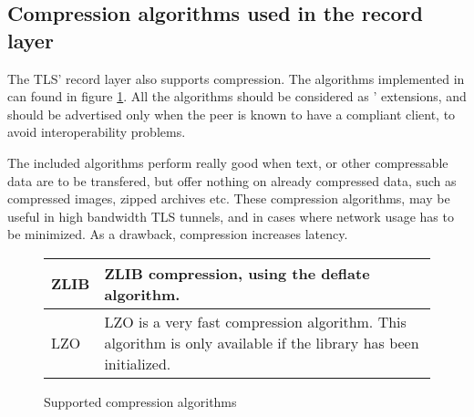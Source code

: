 \subsection{Compression algorithms used in the record layer}
The TLS' record layer also supports compression. The algorithms
implemented in \gnutls{} can found in figure \ref{fig:compression}.
All the algorithms should be considered as \gnutls' extensions, and
should be advertised only when the peer is known to have a compliant client,
to avoid interoperability problems.
\par
The included algorithms perform really good when text, or other
compressable data are to be transfered, but offer nothing on already 
compressed data, such as compressed images, zipped archives etc.
These compression algorithms, may be useful in high bandwidth TLS tunnels,
and in cases where network usage has to be minimized. As a drawback, 
compression increases latency.

\begin{figure}[hbtp]
\begin{tabular}{|l|p{9cm}|}

\hline
ZLIB & ZLIB compression, using the deflate algorithm.
\\
\hline
LZO & LZO is a very fast compression algorithm. This algorithm is only
available if the \gnutlse{} library has been initialized.
\\
\hline
\end{tabular}
\caption{Supported compression algorithms}
\label{fig:compression}
\end{figure}


